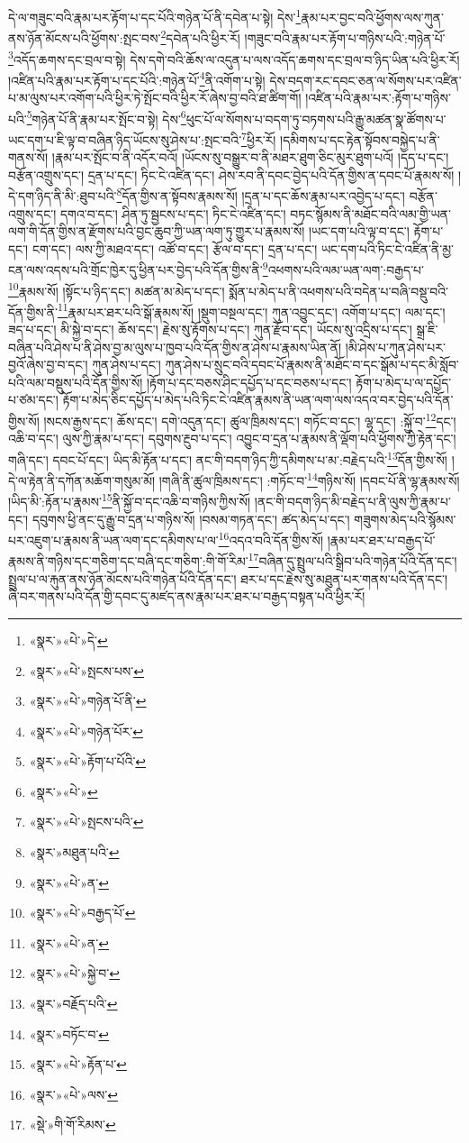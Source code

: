 དེ་ལ་གཟུང་བའི་རྣམ་པར་རྟོག་པ་དང་པོའི་གཉེན་པོ་ནི་དབེན་པ་སྟེ། དེས་\footnote{«སྣར་»«པེ་»དེ་}རྣམ་པར་བྱང་བའི་ཕྱོགས་ལས་ཀུན་ནས་ཉོན་མོངས་པའི་ཕྱོགས་:སྤང་བས་\footnote{«སྣར་»«པེ་»སྤངས་པས་}དབེན་པའི་ཕྱིར་རོ། །གཟུང་བའི་རྣམ་པར་རྟོག་པ་གཉིས་པའི་:གཉེན་པོ་\footnote{«སྣར་»«པེ་»གཉེན་པོ་ནི་}འདོད་ཆགས་དང་བྲལ་བ་སྟེ། དེས་དགེ་བའི་ཆོས་ལ་འདུན་པ་ལས་འདོད་ཆགས་དང་བྲལ་བ་ཉིད་ཡིན་པའི་ཕྱིར་རོ། །འཛིན་པའི་རྣམ་པར་རྟོག་པ་དང་པོའི་:གཉེན་པོ་\footnote{«སྣར་»«པེ་»གཉེན་པོར་}ནི་འགོག་པ་སྟེ། དེས་བདག་རང་དབང་ཅན་ལ་སོགས་པར་འཛིན་པ་མ་ལུས་པར་འགོག་པའི་ཕྱིར་ཏེ་སྤོང་བའི་ཕྱིར་རོ་ཞེས་བྱ་བའི་ཐ་ཚིག་གོ། །འཛིན་པའི་རྣམ་པར་:རྟོག་པ་གཉིས་པའི་\footnote{«སྣར་»«པེ་»རྟོག་པ་པོའི་}གཉེན་པོ་ནི་རྣམ་པར་སྤོང་བ་སྟེ། དེས་\footnote{«སྣར་»«པེ་»}ཕུང་པོ་ལ་སོགས་པ་བདག་ཏུ་བཏགས་པའི་རྒྱུ་མཚན་སྣ་ཚོགས་པ་ཡང་དག་པ་ཇི་ལྟ་བ་བཞིན་ཉིད་ཡོངས་སུ་ཤེས་པ་:སྤང་བའི་\footnote{«སྣར་»«པེ་»སྤངས་པའི་}ཕྱིར་རོ། །དམིགས་པ་དང་རྟེན་སྟོབས་བསྐྱེད་པ་ནི་གནས་སོ། །རྣམ་པར་སྤོང་བ་ནི་འདོར་བའོ། །ཡོངས་སུ་བསྒྱུར་བ་ནི་མཐར་ཐུག་ཅིང་མུར་ཐུག་པའོ། །དད་པ་དང་། བརྩོན་འགྲུས་དང་། དྲན་པ་དང་། ཏིང་ངེ་འཛིན་དང་། ཤེས་རབ་ནི་དབང་བྱེད་པའི་དོན་གྱིས་ན་དབང་པོ་རྣམས་སོ། །དེ་དག་ཉིད་ནི་མི་:ཐུབ་པའི་\footnote{«སྣར་»མཐུན་པའི་}དོན་གྱིས་ན་སྟོབས་རྣམས་སོ། །དྲན་པ་དང་ཆོས་རྣམ་པར་འབྱེད་པ་དང་། བརྩོན་འགྲུས་དང་། དགའ་བ་དང་། ཤིན་ཏུ་སྦྱངས་པ་དང་། ཏིང་ངེ་འཛིན་དང་། བཏང་སྙོམས་ནི་མཐོང་བའི་ལམ་གྱི་ཡན་ལག་གི་དོན་གྱིས་ན་རྫོགས་པའི་བྱང་ཆུབ་ཀྱི་ཡན་ལག་ཏུ་གྱུར་པ་རྣམས་སོ། །ཡང་དག་པའི་ལྟ་བ་དང་། རྟོག་པ་དང་། ངག་དང་། ལས་ཀྱི་མཐའ་དང་། འཚོ་བ་དང་། རྩོལ་བ་དང་། དྲན་པ་དང་། ཡང་དག་པའི་ཏིང་ངེ་འཛིན་ནི་མྱ་ངན་ལས་འདས་པའི་གྲོང་ཁྱེར་དུ་ཕྱིན་པར་བྱེད་པའི་དོན་གྱིས་ནི་\footnote{«སྣར་»«པེ་»ན་}འཕགས་པའི་ལམ་ཡན་ལག་:བརྒྱད་པ་\footnote{«སྣར་»«པེ་»བརྒྱད་པོ་}རྣམས་སོ། །སྟོང་པ་ཉིད་དང་། མཚན་མ་མེད་པ་དང་། སྨོན་པ་མེད་པ་ནི་འཕགས་པའི་བདེན་པ་བཞི་བསྡུ་བའི་དོན་གྱིས་ནི་\footnote{«སྣར་»«པེ་»ན་}རྣམ་པར་ཐར་པའི་སྒོ་རྣམས་སོ། །སྡུག་བསྔལ་དང་། ཀུན་འབྱུང་དང་། འགོག་པ་དང་། ལམ་དང་། ཟད་པ་དང་། མི་སྐྱེ་བ་དང་། ཆོས་དང་། རྗེས་སུ་རྟོགས་པ་དང་། ཀུན་རྫོབ་དང་། ཡོངས་སུ་འདྲིས་པ་དང་། སྒྲ་ཇི་བཞིན་པའི་ཤེས་པ་ནི་ཤེས་བྱ་མ་ལུས་པ་ཁྱབ་པའི་དོན་གྱིས་ན་ཤེས་པ་རྣམས་ཡིན་ནོ། །མི་ཤེས་པ་ཀུན་ཤེས་པར་བྱའོ་ཞེས་བྱ་བ་དང་། ཀུན་ཤེས་པ་དང་། ཀུན་ཤེས་པ་སྲུང་བའི་དབང་པོ་རྣམས་ནི་མཐོང་བ་དང་སྒོམ་པ་དང་མི་སློབ་པའི་ལམ་བསྡུས་པའི་དོན་གྱིས་སོ། །རྟོག་པ་དང་བཅས་ཤིང་དཔྱོད་པ་དང་བཅས་པ་དང་། རྟོག་པ་མེད་པ་ལ་དཔྱོད་པ་ཙམ་དང་། རྟོག་པ་མེད་ཅིང་དཔྱོད་པ་མེད་པའི་ཏིང་ངེ་འཛིན་རྣམས་ནི་ཡན་ལག་ལས་འདའ་བར་བྱེད་པའི་དོན་གྱིས་སོ། །སངས་རྒྱས་དང་། ཆོས་དང་། དགེ་འདུན་དང་། ཚུལ་ཁྲིམས་དང་། གཏོང་བ་དང་། ལྷ་དང་། :སྐྱོ་བ་\footnote{«སྣར་»«པེ་»སྐྱེ་བ་}དང་། འཆི་བ་དང་། ལུས་ཀྱི་རྣམ་པ་དང་། དབུགས་རྔུབ་པ་དང་། འབྱུང་བ་དྲན་པ་རྣམས་ནི་ལྡོག་པའི་ཕྱོགས་ཀྱི་རྟེན་དང་། གཞི་དང་། དབང་པོ་དང་། ཡིད་མི་རྟོན་པ་དང་། ནང་གི་བདག་ཉིད་ཀྱི་དམིགས་པ་མ་:བརྗེད་པའི་\footnote{«སྣར་»བརྗོད་པའི་}དོན་གྱིས་སོ། །དེ་ལ་རྟེན་ནི་དཀོན་མཆོག་གསུམ་མོ། །གཞི་ནི་ཚུལ་ཁྲིམས་དང་། :གཏོང་བ་\footnote{«སྣར་»བཏོང་བ་}གཉིས་སོ། །དབང་པོ་ནི་ལྷ་རྣམས་སོ། །ཡིད་མི་:རྟོན་པ་རྣམས་\footnote{«སྣར་»«པེ་»རྟོན་པ་}ནི་སྐྱོ་བ་དང་འཆི་བ་གཉིས་ཀྱིས་སོ། །ནང་གི་བདག་ཉིད་མི་བརྗེད་པ་ནི་ལུས་ཀྱི་རྣམ་པ་དང་། དབུགས་ཕྱི་ནང་དུ་རྒྱུ་བ་དྲན་པ་གཉིས་སོ། །བསམ་གཏན་དང་། ཚད་མེད་པ་དང་། གཟུགས་མེད་པའི་སྙོམས་པར་འཇུག་པ་རྣམས་ནི་ཡན་ལག་དང་དམིགས་པ་ལ་\footnote{«སྣར་»«པེ་»ལས་}འདའ་བའི་དོན་གྱིས་སོ། །རྣམ་པར་ཐར་པ་བརྒྱད་པོ་རྣམས་ནི་གཉིས་དང་གཅིག་དང་བཞི་དང་གཅིག་:གི་གོ་རིམ་\footnote{«སྡེ་»གི་གོ་རིམས་}བཞིན་དུ་སྤྲུལ་པའི་སྒྲིབ་པའི་གཉེན་པོའི་དོན་དང་། སྤྲུལ་པ་ལ་རྐུན་ནས་ཉོན་མོངས་པའི་གཉེན་པོའི་དོན་དང་། ཐར་པ་དང་རྗེས་སུ་མཐུན་པར་གནས་པའི་དོན་དང་། ཞི་བར་གནས་པའི་དོན་གྱི་དབང་དུ་མཛད་ནས་རྣམ་པར་ཐར་པ་བརྒྱད་བསྟན་པའི་ཕྱིར་རོ། 